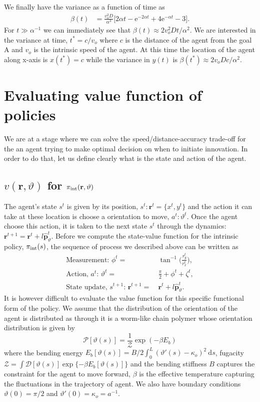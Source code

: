 \documentclass[%
reprint,
superscriptaddress,
floatfix,
amsmath,
amssymb,
aps,
notitlepage
]{revtex4-1}
\def\d{\text{d}}
\def\e{\text{e}}
\def\r{\mathbf{r}}
\def\ph{\hat{\mathbf{p}}}
\def\yd{\dot{y}}
\def\P{\mathcal{P}}
\def\theta{\vartheta}
\begin{document}
We finally have the variance as a function of time as
\begin{align}
    \beta(t) & = \frac{v_o^2 D}{\alpha^3} \bigg[ 2 \alpha t - \e^{-2 \alpha t} + 4 \e^{-\alpha t} - 3 \bigg].
\end{align}
For $t \gg \alpha^{-1}$ we can immediately see that $\beta(t) \approx 2v_o^2 D t/\alpha^2$. We are interested
in the variance at time, $t^* = c/v_o$ where $c$ is the distance of the agent from the goal A and $v_o$
is the intrinsic speed of the agent. At this time the location of the agent along x-axis is $x(t^*)=c$
while the variance in $y(t)$ is $\beta(t^*) \approx 2v_o D c/\alpha^2$.


\section{Evaluating value function of policies}
We are at a stage where we can solve the speed/distance-accuracy trade-off for the an agent trying
to make optimal decision on when to initiate innovation. In order to do that, let us define clearly
what is the state and action of the agent.
\subsection{$v(\r, \theta)$ for $\pi_{\rm int}(\r, \theta)$}
The agent's state $s^t$ is given by its position, $s^t: \r^t=\{ x^t, y^t \}$ and the action it can take
at these location is choose a orientation to move, $a^t: \theta^t$. Once the agent choose this action,
it is taken to the next state $s^t$ through the dynamics: $\r^{t+1} = \r^t + l \ph_\theta^{t}$.
Before we compute the state-value function for the intrinsic policy, $\pi_{\rm int}(s)$, the sequence
of process we described above can be written as
\begin{align}
    \text{Measurement: } \phi^{t} = & \ \tan^{-1} \bigg( \frac{r_y^t}{r_x^t} \bigg), \\
    \text{Action, $a^t$: }\theta^{t} =& \ \frac{\pi}{2} + \phi^{t} + \zeta^t, \\
    \text{State update, $s^{t+1}$: } \r^{t+1} =& \ \r^t + l \ph_\theta^{t}.
\end{align}
It is however difficult to evaluate the value function for this specific functional form of the policy.
We assume that the distribution of the orientation of the agent is distributed as through
it is a worm-like chain polymer whose orientation distribution is given by
\[
    \P[\theta(s)] = \frac{1}{\mathcal{Z}}\exp{(-\beta E_b)}
\]
where the bending energy $E_b[\theta(s)] = B/2 \int_0^L (\theta'(s)-\kappa_o)^2 \ \d s$, fugacity
$\mathcal{Z} = \int \mathcal{D}[\theta(s)] \exp\{ {-\beta E_b[\theta(s)]} \}$ and the bending
stiffness $B$ captures the constraint for the agent to move forward, $\beta$ is the effective
temperature capturing the fluctuations in the trajectory of agent. We also have
boundary conditions $\theta(0) = \pi/2$ and $\theta'(0) = \kappa_o = a^{-1}$. 
\end{document}

